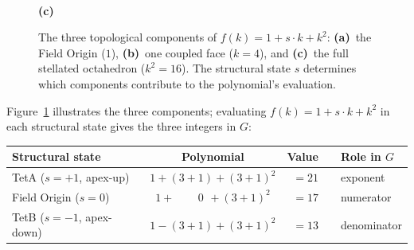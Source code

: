 \documentclass[aps,prd,preprint,superscriptaddress,showpacs,preprintnumbers,amsmath,amssymb,nofootinbib]{revtex4-2}
\begin{document}
\begin{figure}[H]
\begin{minipage}[b]{0.33\textwidth}
\centering
{}
\\[4pt]
\textbf{(c)}
\end{minipage}
\caption{The three topological components of $f(k) = 1 + s \cdot k + k^2$:
\textbf{(a)}~the Field Origin ($1$),
\textbf{(b)}~one coupled face ($k = 4$), and
\textbf{(c)}~the full stellated octahedron ($k^2 = 16$).
The structural state $s$ determines which components contribute to the polynomial's evaluation.}
\label{fig:polynomial}
\end{figure}

Figure~\ref{fig:polynomial} illustrates the three components; evaluating $f(k) = 1 + s \cdot k + k^2$ in each structural state gives the three integers in $G$:

\begin{center}
\renewcommand{\arraystretch}{1.4}
\begin{tabular*}{\textwidth}{@{\extracolsep{\fill}} lcrcl}
\hline
\textbf{Structural state} & \textbf{Polynomial} & \textbf{Value} & & \textbf{Role in $G$} \\
\hline
TetA ($s = +1$, apex-up) & $1 + (3{+}1) + (3{+}1)^2$ & $= 21$ & & exponent \\
Field Origin ($s = 0$) & $1 + \phantom{(3{+}}0\phantom{)} + (3{+}1)^2$ & $= 17$ & & numerator \\
TetB ($s = -1$, apex-down) & $1 - (3{+}1) + (3{+}1)^2$ & $= 13$ & & denominator \\
\hline
\end{tabular*}
\end{center}
\end{document}
